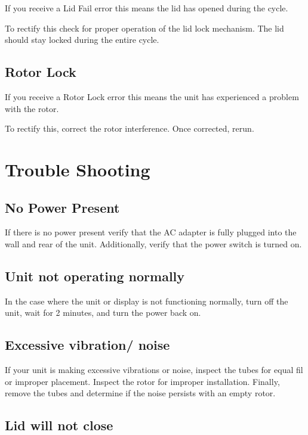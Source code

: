 \documentclass[12pt]{../SOP3_beta}\usepackage[]{graphicx}\usepackage[]{color}
\begin{document}
\NP If you receive a Lid Fail error this means the lid has opened during the cycle. 

\NP To rectify this check for proper operation of the lid lock mechanism. The lid should stay locked during the entire cycle. 

\subsection*{Rotor Lock}

\NP If you receive a Rotor Lock error this means the unit has experienced a problem with the rotor. 

\NP To rectify this, correct the rotor interference. Once corrected, rerun. 

\section{Trouble Shooting}

\subsection*{No Power Present} 

\NP If there is no power present verify that the AC adapter is fully plugged into the wall and rear of the unit. Additionally, verify that the power switch is turned on. 

\subsection*{Unit not operating normally}

\NP In the case where the unit or display is not functioning normally, turn off the unit, wait for 2 minutes, and turn the power back on. 

\subsection*{Excessive vibration/ noise}

\NP If your unit is making excessive vibrations or noise, inspect the tubes for equal fil or improper placement. Inspect the rotor for improper installation. Finally, remove the tubes and determine if the noise persists with an empty rotor. 

\subsection*{Lid will not close}
\end{document}
